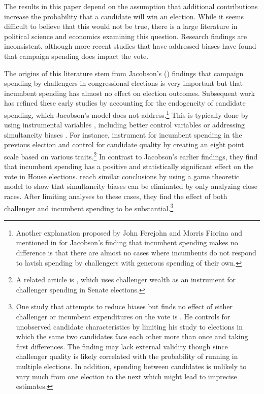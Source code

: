 \documentclass[12pt,final,fleqn]{article}
\theoremstyle{plain}
\begin{document}
The results in this paper depend on the assumption that additional contributions increase the probability that a candidate will win an election. While it seems difficult to believe that this would not be true, there is a large literature in political science and economics examining this question. Research findings are inconsistent, although more recent studies that have addressed biases have found that campaign spending does impact the vote. 

The origins of this literature stem from Jacobson's (\citeyear{jacobson1978effects, jacobson1980money, jacobson1985money}) findings that campaign spending by challengers in congressional elections is very important but that incumbent spending has almost no effect on election outcomes. Subsequent work has refined these early studies by accounting for the endogeneity of candidate spending, which Jacobson's model does not address.\footnote{Another explanation proposed by John Ferejohn and Morris Fiorina and mentioned in \citet{jacobson1985money} for Jacobson's finding that incumbent spending makes no difference is that there are almost no cases where incumbents do not respond to lavish spending by challengers with generous spending of their own.}  This is typically done by using instrumental variables \citep{gerber1998estimating, green1988salvation}, including better control variables \citep{green1988salvation} or addressing simultaneity biases \citep{erikson2000equilibria}. For instance, \citet{green1988salvation} instrument for incumbent spending in the previous election and control for candidate quality by creating an eight point scale based on various traits.\footnote{A related article is \citet{gerber1998estimating}, which uses challenger wealth as an instrument for challenger spending in Senate elections.} In contrast to Jacobson's earlier findings, they find that incumbent spending has a positive and statistically significant effect on the vote in House elections. \citet{erikson2000equilibria} reach similar conclusions by using a game theoretic model to show that simultaneity biases can be eliminated by only analyzing close races. After limiting analyses to these cases, they find the effect of both challenger and incumbent spending to be substantial.\footnote{One study that attempts to reduce biases but finds no effect of either challenger or incumbent expenditures on the vote is \citet{levitt1994using}. He controls for unobserved candidate characteristics by limiting his study to elections in which the same two candidates face each other more than once and taking first differences. The finding may lack external validity though since challenger quality is likely correlated with the probability of running in multiple elections. In addition, spending between candidates is unlikely to vary much from one election to the next which might lead to imprecise estimates.} 
\end{document}
